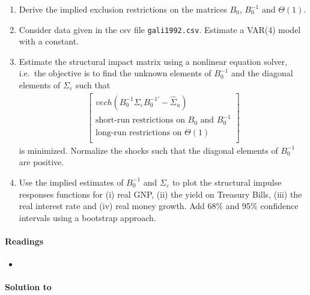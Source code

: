\begin{enumerate}

\item Derive the implied exclusion restrictions on the matrices \(B_{0}\), \(B_{0}^{-1}\) and \(\Theta(1)\).

\item Consider data given in the csv file \texttt{gali1992.csv}.
Estimate a VAR{(4)} model with a constant.

\item Estimate the structural impact matrix using a nonlinear equation solver,
  i.e.\ the objective is to find the unknown elements of \(B_{0}^{-1}\) and the diagonal elements of \(\Sigma_{\varepsilon} \) such that
\begin{align*}
\begin{bmatrix}
vech(B_{0}^{-1} \Sigma_{\varepsilon} B_{0}^{-1'}-\hat{\Sigma}_u)\\
\text{short-run restrictions on~}B_{0} \text{~and~} B_{0}^{-1} \\
\text{long-run restrictions on~}\Theta(1)\\
\end{bmatrix}
\end{align*}
is minimized.
Normalize the shocks such that the diagonal elements of \(B_{0}^{-1}\) are positive.

\item Use the implied estimates of \(B_{0}^{-1}\) and \(\Sigma_{\varepsilon}\) to plot the structural impulse responses functions
  for (i) real GNP, (ii) the yield on Treasury Bills, (iii) the real interest rate and (iv) real money growth.
Add 68\% and 95\% confidence intervals using a bootstrap approach.
\end{enumerate}

\paragraph{Readings}
\begin{itemize}
\item \textcite{Gali_1992_HowWellDoes}
\end{itemize}

\begin{solution}\textbf{Solution to }
\ifDisplaySolutions%

\fi
\newpage
\end{solution}